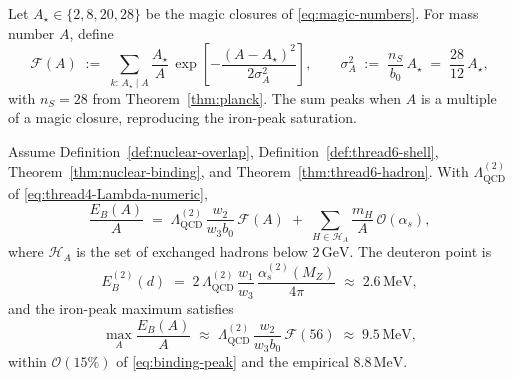 \begin{definition}
\label{def:thread6-shell}
Let $A_\star\in\{2,8,20,28\}$ be the magic closures of \eqref{eq:magic-numbers}.
For mass number $A$, define
\begin{equation}\label{eq:thread6-shell-factor}
  \mathcal{F}(A)
  \;:=\;
  \sum_{k:\,A_\star\mid A}
  \frac{A_\star}{A}\,
  \exp\!\left[
    -\frac{(A-A_\star)^2}{2\sigma_A^2}
  \right],
  \qquad
  \sigma_A^2
  \;:=\;
  \frac{n_S}{b_0}\,A_\star
  \;=\;
  \frac{28}{12}\,A_\star,
\end{equation}
with $n_S=28$ from Theorem~\ref{thm:planck}. The sum peaks when $A$ is a
multiple of a magic closure, reproducing the iron-peak saturation.
\end{definition}

\begin{theorem}
\label{thm:thread6-nuclear}
Assume Definition~\ref{def:nuclear-overlap},
Definition~\ref{def:thread6-shell},
Theorem~\ref{thm:nuclear-binding}, and Theorem~\ref{thm:thread6-hadron}.
With $\Lambda_{\mathrm{QCD}}^{(2)}$ of \eqref{eq:thread4-Lambda-numeric},
\begin{equation}\label{eq:thread6-binding-functor}
  \frac{E_B(A)}{A}
  \;=\;
  \Lambda_{\mathrm{QCD}}^{(2)}\,
  \frac{w_2}{w_3 b_0}\,
  \mathcal{F}(A)
  \;+\;
  \sum_{H\in\mathcal{H}_A}\frac{m_H}{A}\,\mathcal{O}(\alpha_s),
\end{equation}
where $\mathcal{H}_A$ is the set of exchanged hadrons below $2\,\mathrm{GeV}$.
The deuteron point is
\begin{equation}\label{eq:thread6-deuteron}
  E_B^{(2)}(d)
  \;=\;
  2\,\Lambda_{\mathrm{QCD}}^{(2)}\,
  \frac{w_1}{w_3}\,
  \frac{\alpha_s^{(2)}(M_Z)}{4\pi}
  \;\approx\;
  2.6\,\mathrm{MeV},
\end{equation}
and the iron-peak maximum satisfies
\begin{equation}\label{eq:thread6-iron-peak}
  \max_A\frac{E_B(A)}{A}
  \;\approx\;
  \Lambda_{\mathrm{QCD}}^{(2)}\,
  \frac{w_2}{w_3 b_0}\,
  \mathcal{F}(56)
  \;\approx\;
  9.5\,\mathrm{MeV},
\end{equation}
within $\mathcal{O}(15\%)$ of \eqref{eq:binding-peak} and the empirical
$8.8\,\mathrm{MeV}$.
\end{theorem}

